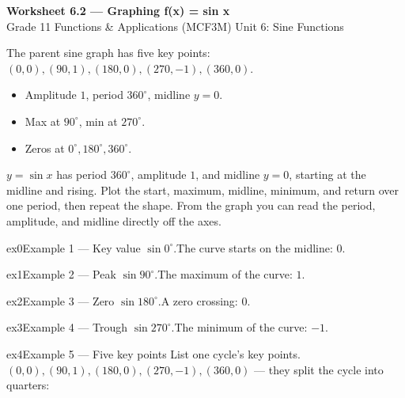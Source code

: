 \documentclass[11pt]{article}
\begin{document}
\begin{center}
{\LARGE\bfseries\color{titleblue}Worksheet 6.2 --- Graphing f(x) = sin x}\\[2pt]
{\small Grade 11 Functions \& Applications (MCF3M) \textperiodcentered{} Unit 6: Sine Functions}
\end{center}

\begin{ideabox}
The parent sine graph has five key points: $(0,0),(90,1),(180,0),(270,-1),(360,0)$.
\begin{itemize}[leftmargin=*,itemsep=2pt]
  \item Amplitude $1$, period $360^\circ$, midline $y=0$.
  \item Max at $90^\circ$, min at $270^\circ$.
  \item Zeros at $0^\circ,180^\circ,360^\circ$.
\end{itemize}
\end{ideabox}

\begin{learnbox}
$y=\sin x$ has period $360^\circ$, amplitude $1$, and midline $y=0$, starting at the midline and rising.
Plot the start, maximum, midline, minimum, and return over one period, then repeat the shape.
From the graph you can read the period, amplitude, and midline directly off the axes.
\end{learnbox}


\begin{example}{ex0}{Example 1 --- Key value}
$\sin0^\circ$.\soln The curve starts on the midline: $0$.
\end{example}

\begin{example}{ex1}{Example 2 --- Peak}
$\sin90^\circ$.\soln The maximum of the curve: $1$.
\end{example}

\begin{example}{ex2}{Example 3 --- Zero}
$\sin180^\circ$.\soln A zero crossing: $0$.
\end{example}

\begin{example}{ex3}{Example 4 --- Trough}
$\sin270^\circ$.\soln The minimum of the curve: $-1$.
\end{example}

\begin{example}{ex4}{Example 5 --- Five key points}
List one cycle's key points.\soln $(0,0),(90,1),(180,0),(270,-1),(360,0)$ — they split the cycle into quarters:
\end{example}
\end{document}
